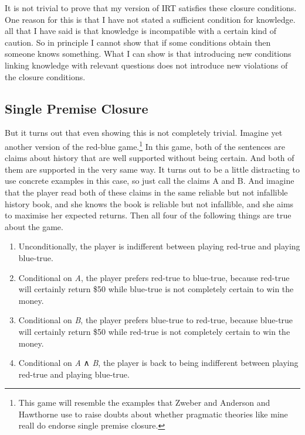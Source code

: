 \documentclass[
  11pt,
]{book}
\providecommand{\tightlist}{%
  \setlength{\itemsep}{0pt}\setlength{\parskip}{0pt}}
\begin{document}
It is not trivial to prove that my version of IRT satisfies these closure conditions. One reason for this is that I have not stated a sufficient condition for knowledge. all that I have said is that knowledge is incompatible with a certain kind of caution. So in principle I cannot show that if some conditions obtain then someone knows something. What I can show is that introducing new conditions linking knowledge with relevant questions does not introduce new violations of the closure conditions.

\hypertarget{andelim}{%
\subsection{Single Premise Closure}\label{andelim}}

But it turns out that even showing this is not completely trivial. Imagine yet another version of the red-blue game.\footnote{This game will resemble the examples that Zweber \citeyearpar{Zweber2016} and Anderson and Hawthorne \citeyearpar{AndersonHawthorne2019b} use to raise doubts about whether pragmatic theories like mine reall do endorse single premise closure.} In this game, both of the sentences are claims about history that are well supported without being certain. And both of them are supported in the very same way. It turns out to be a little distracting to use concrete examples in this case, so just call the claims A and B. And imagine that the player read both of these claims in the same reliable but not infallible history book, and she knows the book is reliable but not infallible, and she aims to maximise her expected returns. Then all four of the following things are true about the game.

\begin{enumerate}
\def\labelenumi{\arabic{enumi}.}
\tightlist
\item
  Unconditionally, the player is indifferent between playing red-true and playing blue-true.
\item
  Conditional on \emph{A}, the player prefers red-true to blue-true, because red-true will certainly return \$50 while blue-true is not completely certain to win the money.
\item
  Conditional on \emph{B}, the player prefers blue-true to red-true, because blue-true will certainly return \$50 while red-true is not completely certain to win the money.
\item
  Conditional on \emph{A} ∧ \emph{B}, the player is back to being indifferent between playing red-true and playing blue-true.
\end{enumerate}
\end{document}
